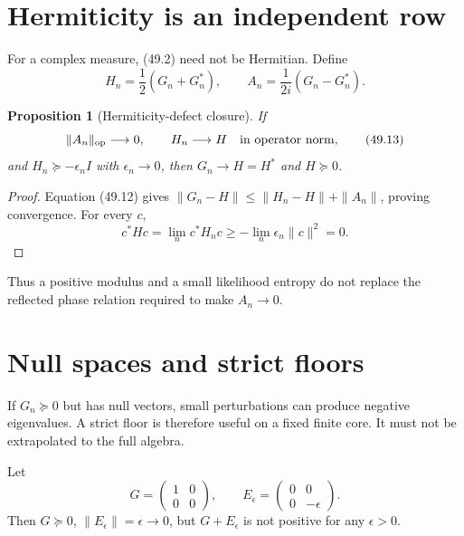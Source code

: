 \documentclass[11pt]{article}
\newtheorem{proposition}[theorem]{Proposition}
\theoremstyle{remark}
\begin{document}
\section{Hermiticity is an independent row}

For a complex measure, (49.2) need not be Hermitian.  Define
\[
 H_n=\frac12(G_n+G_n^*),\qquad
 A_n=\frac1{2i}(G_n-G_n^*).                             \tag{49.12}
\]

\begin{proposition}[Hermiticity-defect closure]
\label{prop:v15v49-hermiticity}
If
\[
 \|A_n\|_{\rm op}\longrightarrow0,\qquad
 H_n\longrightarrow H
 \quad\text{in operator norm},                          \tag{49.13}
\]
and \(H_n\succeq-\epsilon_nI\) with \(\epsilon_n\to0\),
then \(G_n\to H=H^*\) and \(H\succeq0\).
\end{proposition}

\begin{proof}
Equation (49.12) gives
\(\|G_n-H\|\leq\|H_n-H\|+\|A_n\|\), proving convergence.
For every \(c\),
\[
 c^*Hc=\lim_n c^*H_nc\geq
 -\lim_n\epsilon_n\|c\|^2=0.
\]
\end{proof}

Thus a positive modulus and a small likelihood entropy do not
replace the reflected phase relation required to make
\(A_n\to0\).

\section{Null spaces and strict floors}

If \(G_n\succeq0\) but has null vectors, small perturbations can
produce negative eigenvalues.  A strict floor is therefore useful
on a fixed finite core.  It must not be extrapolated to the full
algebra.

\begin{countertheorem}
\label{cth:v15v49-null}
Let
\[
 G=\begin{pmatrix}1&0\\0&0\end{pmatrix},\qquad
 E_\epsilon=\begin{pmatrix}0&0\\0&-\epsilon\end{pmatrix}. \tag{49.14}
\]
Then \(G\succeq0\), \(\|E_\epsilon\|=\epsilon\to0\), but
\(G+E_\epsilon\) is not positive for any \(\epsilon>0\).
\end{countertheorem}
\end{document}

